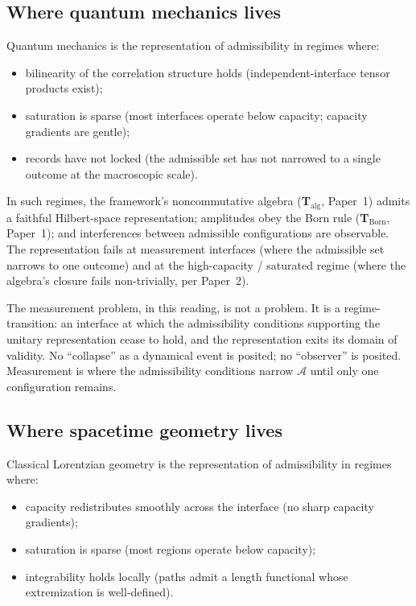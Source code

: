 \documentclass[11pt]{article}
\begin{document}
\subsection{Where quantum mechanics lives}\label{sec:where_QM}

Quantum mechanics is the representation of admissibility in regimes where:

\begin{itemize}
    \item bilinearity of the correlation structure holds (independent-interface tensor products exist);
    \item saturation is sparse (most interfaces operate below capacity; capacity gradients are gentle);
    \item records have not locked (the admissible set has not narrowed to a single outcome at the macroscopic scale).
\end{itemize}

\noindent In such regimes, the framework's noncommutative algebra (\textbf{T}$_{\mathrm{alg}}$, Paper~1) admits a faithful Hilbert-space representation; amplitudes obey the Born rule (\textbf{T}$_{\mathrm{Born}}$, Paper~1); and interferences between admissible configurations are observable. The representation fails at measurement interfaces (where the admissible set narrows to one outcome) and at the high-capacity / saturated regime (where the algebra's closure fails non-trivially, per Paper~2).

The measurement problem, in this reading, is not a problem. It is a regime-transition: an interface at which the admissibility conditions supporting the unitary representation cease to hold, and the representation exits its domain of validity. No ``collapse'' as a dynamical event is posited; no ``observer'' is posited. Measurement is where the admissibility conditions narrow $\mathcal{A}$ until only one configuration remains.

\subsection{Where spacetime geometry lives}\label{sec:where_GR}

Classical Lorentzian geometry is the representation of admissibility in regimes where:

\begin{itemize}
    \item capacity redistributes smoothly across the interface (no sharp capacity gradients);
    \item saturation is sparse (most regions operate below capacity);
    \item integrability holds locally (paths admit a length functional whose extremization is well-defined).
\end{itemize}
\end{document}

